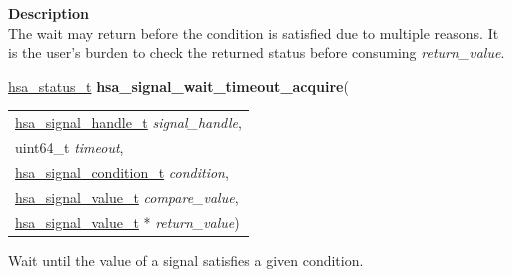 \documentclass[final]{book}
\newcommand{\hsaarg}[1]{\textit{#1}}
\begin{document}
\vspace{-4mm}\noindent\textbf{Description}\\[1mm]
The wait may return before the condition is satisfied due to multiple reasons. It is the user's burden to check the returned status before consuming \textit{return_value}. 


\noindent\begin{tcolorbox}[breakable,nobeforeafter,colframe=white,colback=lightgray,left=0mm]
\hyperlink{group__status_1gad755322e7ff95456520e8abdbe90d225}{hsa_status_t} \hypertarget{group__signals_1gabe68135cd6a2b116d91e5ac4ed53db9a}{\textbf{hsa_signal_wait_timeout_acquire}}(
\vspace{-3.5mm}\begin{longtable}{@{}p{\textwidth}}
\hspace{1.7em}\hyperlink{group__signals_1ga6592c136d70853d855bc11d9efdbf534}{hsa_signal_handle_t} \hsaarg{signal_handle},\\
\hspace{1.7em}uint64_t \hsaarg{timeout},\\
\hspace{1.7em}\hyperlink{group__signals_1gab7190fcff48c6dbeded341389ed17c8d}{hsa_signal_condition_t} \hsaarg{condition},\\
\hspace{1.7em}\hyperlink{group__signals_1gacdf7a070a2f988bcf97904a1f5d0e573}{hsa_signal_value_t} \hsaarg{compare_value},\\
\hspace{1.7em}\hyperlink{group__signals_1gacdf7a070a2f988bcf97904a1f5d0e573}{hsa_signal_value_t} * \hsaarg{return_value})\end{longtable}

\end{tcolorbox}
Wait until the value of a signal satisfies a given condition.
\end{document}
